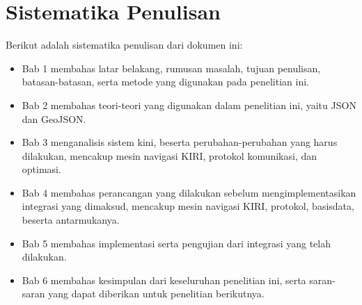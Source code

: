 \section{Sistematika Penulisan}

Berikut adalah sistematika penulisan dari dokumen ini:

\begin{itemize}
	\item Bab 1 membahas latar belakang, rumusan masalah, tujuan penulisan, batasan-batasan, serta metode yang digunakan pada penelitian ini.
	\item Bab 2 membahas teori-teori yang digunakan dalam penelitian ini, yaitu JSON dan GeoJSON.
	\item Bab 3 menganalisis sistem kini, beserta perubahan-perubahan yang harus dilakukan, mencakup mesin navigasi KIRI, protokol komunikasi, dan optimasi.
	\item Bab 4 membahas perancangan yang dilakukan sebelum mengimplementasikan integrasi yang dimaksud, mencakup mesin navigasi KIRI, protokol, basisdata, beserta antarmukanya.
	\item Bab 5 membahas implementasi serta pengujian dari integrasi yang telah dilakukan.
	\item Bab 6 membahas kesimpulan dari keseluruhan penelitian ini, serta saran-saran yang dapat diberikan untuk penelitian berikutnya.
\end{itemize}